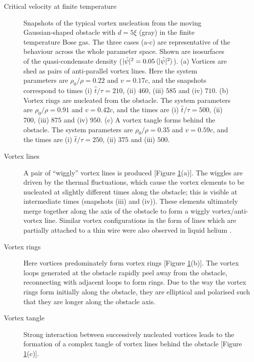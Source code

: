 \begin{chapter}{\label{cha:nonequib}Critical velocity at finite temperature}
\begin{figure}
    \caption{\label{fig:vort-lines} Snapshots of the typical vortex nucleation from the moving Gaussian-shaped obstacle with $d=5\xi$ (gray) in the finite temperature Bose gas. The three cases (a-c) are representative of the behaviour across the whole parameter space. Shown are  isosurfaces of the quasi-condensate density ($|\hat{\psi}|^2 = 0.05\braket{|\hat{\psi}|^2}$).  (a) Vortices are shed as pairs of anti-parallel vortex lines.  Here the system parameters are $\rho_0/\rho = 0.22$ and $v=0.17c$, and the snapshots correspond to times (i) $\hat{t}/\tau=210$, (ii) $460$, (iii) $585$ and (iv) $710$.  (b) Vortex rings are nucleated from the obstacle.  The system parameters are $\rho_0/\rho = 0.91$ and $v=0.42c$, and the times are (i) $\hat{t}/\tau=500$, (ii) $700$, (iii) $875$ and (iv) $950$. (c) A vortex tangle forms behind the obstacle. The system parameters are $\rho_0/\rho = 0.35$ and $v=0.59c$, and the times are (i) $\hat{t}/\tau=250$, (ii) $375$ and (iii) $500$. }
\end{figure}

\begin{description}
\item[Vortex lines] A pair of ``wiggly'' vortex lines is produced  [Figure  \ref{fig:vort-lines}(a)].  The wiggles are driven by the thermal fluctuations, which cause the vortex elements to be nucleated at slightly different times along the obstacle; this is visible at intermediate times (snapshots (iii) and (iv)).   These elements ultimately merge together along the axis of the obstacle to form a wiggly vortex/anti-vortex line. Similar vortex configurations
in the form of lines which are partially attached to a thin wire 
were also observed in liquid helium \cite{zieve2001}. 
\item[Vortex rings]  Here vortices predominately form vortex
rings [Figure \ref{fig:vort-lines}(b)].  The vortex loops generated
at the obstacle rapidly peel away from the obstacle, reconnecting with
adjacent loops to form rings. Due to the way the vortex rings form initially along the obstacle, they are elliptical and polarised such that they are longer along the obstacle axis. 
\item[Vortex tangle]  Strong
interaction between successively nucleated vortices leads to the formation of a complex tangle of vortex lines behind the obstacle [Figure \ref{fig:vort-lines}(c)].
\end{description}


\end{chapter}
